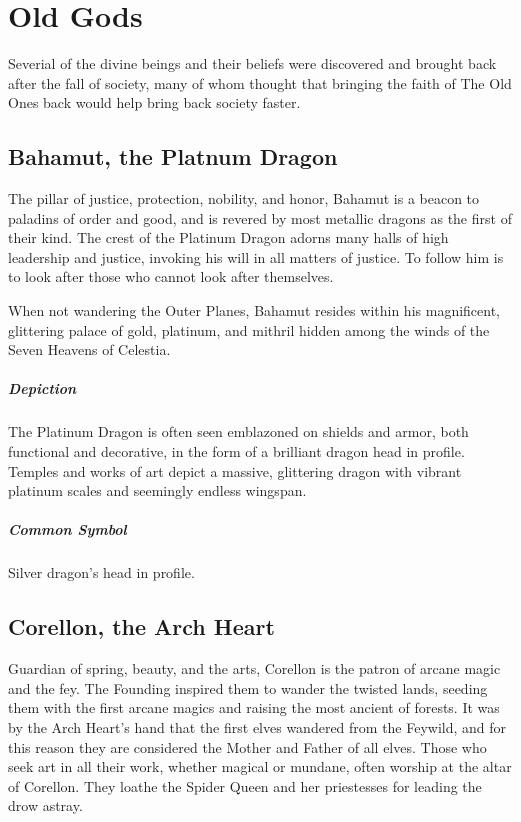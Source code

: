 \documentclass[letterpaper,twocolumn,openany,nodeprecatedcode]{dndbook}
\begin{document}
\section{Old Gods}

Severial of the divine beings and their beliefs were discovered and brought back after the
fall of society, many of whom thought that bringing the faith of The Old Ones back would
help bring back society faster.

\subsection{Bahamut, the Platnum Dragon}

The pillar of justice, protection, nobility, and honor, Bahamut is a beacon to
paladins of order and good, and is revered by most metallic dragons as the first of
their kind. The crest of the Platinum Dragon adorns many halls of high leadership and
justice, invoking his will in all matters of justice. To follow him is to look after
those who cannot look after themselves.

When not wandering the Outer Planes, Bahamut resides within his magnificent, glittering
palace of gold, platinum, and mithril hidden among the winds of the Seven Heavens of Celestia.

\subparagraph{Depiction}
The Platinum Dragon is often seen emblazoned on shields and armor, both functional and
decorative, in the form of a brilliant dragon head in profile. Temples and works of art
depict a massive, glittering dragon with vibrant platinum scales and seemingly
endless wingspan.

\subparagraph{Common Symbol}
Silver dragon’s head in profile.

\subsection{Corellon, the Arch Heart}

Guardian of spring, beauty, and the arts, Corellon is the patron of arcane magic and
the fey. The Founding inspired them to wander the twisted lands, seeding them with the
first arcane magics and raising the most ancient of forests. It was by the Arch Heart’s
hand that the first elves wandered from the Feywild, and for this reason they are
considered the Mother and Father of all elves. Those who seek art in all their work,
whether magical or mundane, often worship at the altar of Corellon. They loathe the
Spider Queen and her priestesses for leading the drow astray.
\end{document}

